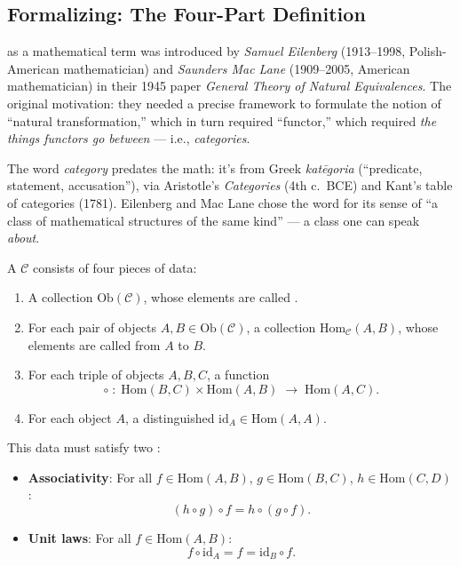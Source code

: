 \subsection{Formalizing: The Four-Part Definition}

\begin{nameorigin}
 as a mathematical term was introduced by \emph{Samuel
Eilenberg} (1913--1998, Polish-American mathematician) and
\emph{Saunders Mac Lane} (1909--2005, American mathematician) in their
1945 paper \emph{General Theory of Natural Equivalences}. The original
motivation: they needed a precise framework to formulate the notion of
``natural transformation,'' which in turn required ``functor,'' which
required \emph{the things functors go between} — i.e., \emph{categories}.

The word \emph{category} predates the math: it's from Greek
\emph{katēgoria} (``predicate, statement, accusation''), via Aristotle's
\emph{Categories} (4th c.\ BCE) and Kant's table of categories (1781).
Eilenberg and Mac Lane chose the word for its sense of ``a class of
mathematical structures of the same kind'' — a class one can speak \emph{about}.
\end{nameorigin}

A  $\mathcal{C}$ consists of four pieces of data:

\begin{enumerate}
  \item A collection $\mathrm{Ob}(\mathcal{C})$, whose elements are called
        .
  \item For each pair of objects $A, B \in \mathrm{Ob}(\mathcal{C})$, a
        collection $\mathrm{Hom}_{\mathcal{C}}(A, B)$, whose elements are
        called  from $A$ to $B$.
  \item For each triple of objects $A, B, C$, a  function
        \[
          \circ\;:\;\mathrm{Hom}(B, C) \times \mathrm{Hom}(A, B)
          \;\longrightarrow\; \mathrm{Hom}(A, C).
        \]
  \item For each object $A$, a distinguished 
        $\mathrm{id}_A \in \mathrm{Hom}(A, A)$.
\end{enumerate}

This data must satisfy two :

\begin{itemize}
  \item \textbf{Associativity}: For all $f \in \mathrm{Hom}(A,B)$,
        $g \in \mathrm{Hom}(B,C)$, $h \in \mathrm{Hom}(C,D)$:
        \[
          (h \circ g) \circ f = h \circ (g \circ f).
        \]
  \item \textbf{Unit laws}: For all $f \in \mathrm{Hom}(A,B)$:
        \[
          f \circ \mathrm{id}_A = f = \mathrm{id}_B \circ f.
        \]
\end{itemize}

